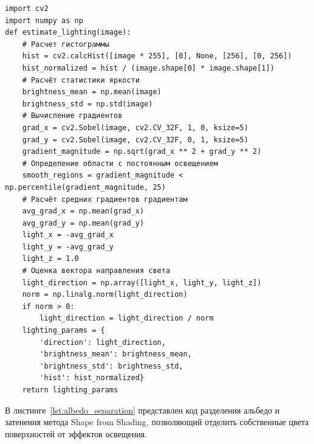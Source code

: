 \begin{center}
    \begin{lstlisting}[label=lst:light_estimation,caption=Оценка освещения]
import cv2
import numpy as np
def estimate_lighting(image):
    # Расчет гистограммы
    hist = cv2.calcHist([image * 255], [0], None, [256], [0, 256])
    hist_normalized = hist / (image.shape[0] * image.shape[1])
    # Расчёт статистики яркости
    brightness_mean = np.mean(image)
    brightness_std = np.std(image)
    # Вычисление градиентов
    grad_x = cv2.Sobel(image, cv2.CV_32F, 1, 0, ksize=5)
    grad_y = cv2.Sobel(image, cv2.CV_32F, 0, 1, ksize=5)
    gradient_magnitude = np.sqrt(grad_x ** 2 + grad_y ** 2)
    # Определение области с постоянным освещением
    smooth_regions = gradient_magnitude < np.percentile(gradient_magnitude, 25)
    # Расчёт средних градиентов градиентам
    avg_grad_x = np.mean(grad_x)
    avg_grad_y = np.mean(grad_y)
    light_x = -avg_grad_x
    light_y = -avg_grad_y
    light_z = 1.0
    # Оценка вектора направления света
    light_direction = np.array([light_x, light_y, light_z])
    norm = np.linalg.norm(light_direction)
    if norm > 0:
        light_direction = light_direction / norm
    lighting_params = {
        'direction': light_direction,
        'brightness_mean': brightness_mean,
        'brightness_std': brightness_std,
        'hist': hist_normalized}
    return lighting_params
    \end{lstlisting}
\end{center}

В листинге~\ref{lst:albedo_separation} представлен код разделения альбедо и затенения метода Shape from Shading, позволяющий отделить собственные цвета поверхностей от эффектов освещения.

